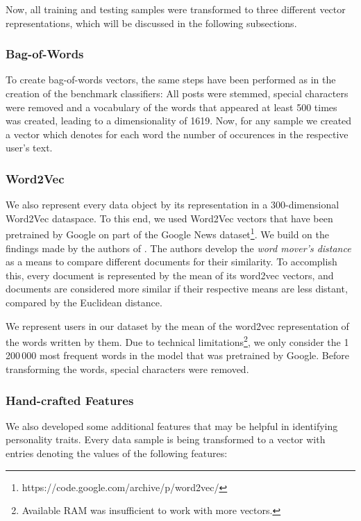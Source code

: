 \documentclass[12pt]{elsarticle}
\begin{document}
Now, all training and testing samples were transformed to three different vector representations, which will be discussed in the following subsections.

\subsubsection{Bag-of-Words}
To create bag-of-words vectors, the same steps have been performed as in the creation of the benchmark classifiers: All posts were stemmed, special characters were removed and a vocabulary of the words that appeared at least 500 times was created, leading to a dimensionality of 1619. Now, for any sample we created a vector which denotes for each word the number of occurences in the respective user's text.

\subsubsection{Word2Vec}
We also represent every data object by its representation in a 300-dimensional Word2Vec dataspace. To this end, we used Word2Vec vectors that have been pretrained by Google on part of the Google News dataset\footnote{https://code.google.com/archive/p/word2vec/}. We build on the findings made by the authors of \cite{wmd}. The authors develop the \textit{word mover's distance} as a means to compare different documents for their similarity. To accomplish this, every document is represented by the mean of its word2vec vectors, and documents are considered more similar if their respective means are less distant, compared by the Euclidean distance. 


We represent users in our dataset by the mean of the word2vec representation of the words written by them. Due to technical limitations\footnote{Available RAM was insufficient to work with more vectors.}, we only consider the 1\,200\,000 most frequent words in the model that was pretrained by Google. Before transforming the words, special characters were removed. 


\subsubsection{Hand-crafted Features}
We also developed some additional features that may be helpful in identifying personality traits.  Every data sample is being transformed to a vector with entries denoting the values of the following features:
\end{document}
